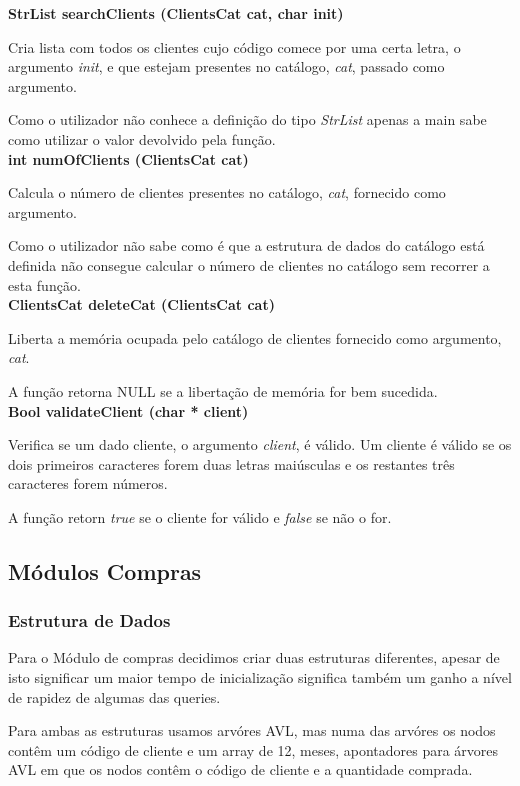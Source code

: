 \documentclass[10pt] {article}
\begin{document}
\noindent \textbf{StrList searchClients (ClientsCat cat, char init)}
\par Cria lista com todos os clientes cujo código comece por uma certa letra, o argumento \emph{init}, e que
estejam presentes no catálogo, \emph{cat}, passado como argumento.
\par Como o utilizador não conhece a definição do tipo \emph{StrList} apenas a main sabe como utilizar
o valor devolvido pela função. \\

\noindent \textbf{int numOfClients (ClientsCat cat)}
\par Calcula o número de clientes presentes no catálogo, \emph{cat}, fornecido como argumento.
\par Como o utilizador não sabe como é que a estrutura de dados do catálogo está definida não consegue
calcular o número de clientes no catálogo sem recorrer a esta função. \\

\noindent \textbf{ClientsCat deleteCat (ClientsCat cat)}
\par Liberta a memória ocupada pelo catálogo de clientes fornecido como argumento, \emph{cat}.
\par A função retorna NULL se a libertação de memória for bem sucedida. \\

\noindent \textbf{Bool validateClient (char * client)}
\par Verifica se um dado cliente, o argumento \emph{client}, é válido. Um cliente é válido se os dois primeiros
caracteres forem duas letras maiúsculas e os restantes três caracteres forem números.
\par A função retorn \emph{true} se o cliente for válido e \emph{false} se não o for.

\subsection{Módulos Compras}

\subsubsection{Estrutura de Dados}
\indent\par Para o Módulo de compras decidimos criar duas estruturas diferentes, apesar de isto significar um maior 
tempo  de inicialização significa também um ganho a nível de rapidez de algumas das queries.
 \par Para ambas as estruturas usamos arvóres AVL, mas numa das arvóres os nodos contêm um código de cliente 
 e um array de 12, meses, apontadores para árvores AVL em que os nodos contêm o código de cliente e a 
 quantidade comprada.
 
\end{document}
